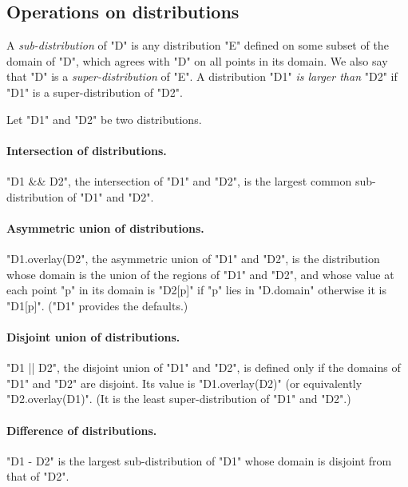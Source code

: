 \subsection{Operations on distributions}

A {\em sub-distribution} of \xcd"D" is any
distribution \xcd"E" defined on some subset of the domain of \xcd"D",
which agrees with \xcd"D" on all points in its domain. We also say
that \xcd"D" is a {\em super-distribution} of \xcd"E". A distribution
\xcd"D1" {\em is larger than} \xcd"D2" if \xcd"D1" is a
super-distribution of \xcd"D2".

Let \xcd"D1" and \xcd"D2" be two distributions.  


\paragraph{Intersection of distributions.}
\xcd"D1 && D2", the intersection of \xcd"D1" and \xcd"D2", is the
largest common sub-distribution of \xcd"D1" and \xcd"D2".

\paragraph{Asymmetric union of distributions.}
\xcd"D1.overlay(D2", the asymmetric union of \xcd"D1" and \xcd"D2", is the
distribution whose domain is the union of the regions of \xcd"D1" and
\xcd"D2", and whose value at each point \xcd"p" in its domain is \xcd"D2[p]"
if \xcd"p" lies in \xcd"D.domain" otherwise it is \xcd"D1[p]". (\xcd"D1" provides the defaults.)

\paragraph{Disjoint union of distributions.}
\xcd"D1 || D2", the disjoint union of \xcd"D1" and \xcd"D2", is
defined only if the domains of \xcd"D1" and \xcd"D2" are disjoint. Its
value is \xcd"D1.overlay(D2)" (or equivalently \xcd"D2.overlay(D1)".
(It is the least super-distribution of \xcd"D1" and \xcd"D2".)

\paragraph{Difference of distributions.}
\xcd"D1 - D2" is the largest sub-distribution of \xcd"D1" whose domain is
disjoint from that of \xcd"D2".


